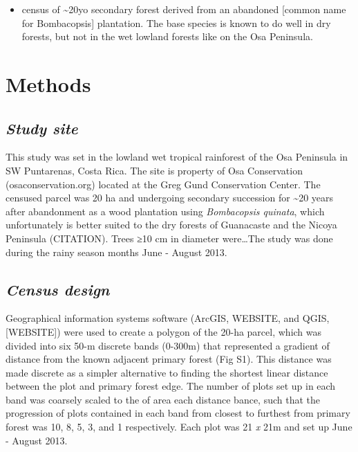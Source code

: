 \documentclass[]{article}
\providecommand{\tightlist}{%
  \setlength{\itemsep}{0pt}\setlength{\parskip}{0pt}}
\begin{document}
\begin{itemize}
\tightlist
\item
  census of \textasciitilde{}20yo secondary forest derived from an
  abandoned {[}common name for Bombacopsis{]} plantation. The base
  species is known to do well in dry forests, but not in the wet lowland
  forests like on the Osa Peninsula.
\end{itemize}

\hypertarget{methods}{%
\section{Methods}\label{methods}}

\hypertarget{study-site}{%
\subsection{\texorpdfstring{\emph{Study
site}}{Study site}}\label{study-site}}

This study was set in the lowland wet tropical rainforest of the Osa
Peninsula in SW Puntarenas, Costa Rica. The site is property of Osa
Conservation (osaconservation.org) located at the Greg Gund Conservation
Center. The censused parcel was 20 ha and undergoing secondary
succession for \textasciitilde{}20 years after abandonment as a wood
plantation using \emph{Bombacopsis quinata}, which unfortunately is
better suited to the dry forests of Guanacaste and the Nicoya Peninsula
(CITATION). Trees ≥10 cm in diameter were\ldots{}The study was done
during the rainy season months June - August 2013.

\hypertarget{census-design}{%
\subsection{\texorpdfstring{\emph{Census
design}}{Census design}}\label{census-design}}

Geographical information systems software (ArcGIS, WEBSITE, and QGIS,
{[}WEBSITE{]}) were used to create a polygon of the 20-ha parcel, which
was divided into six 50-m discrete bands (0-300m) that represented a
gradient of distance from the known adjacent primary forest (Fig S1).
This distance was made discrete as a simpler alternative to finding the
shortest linear distance between the plot and primary forest edge. The
number of plots set up in each band was coarsely scaled to the of area
each distance bance, such that the progression of plots contained in
each band from closest to furthest from primary forest was 10, 8, 5, 3,
and 1 respectively. Each plot was 21 \emph{x} 21m and set up June -
August 2013.
\end{document}
